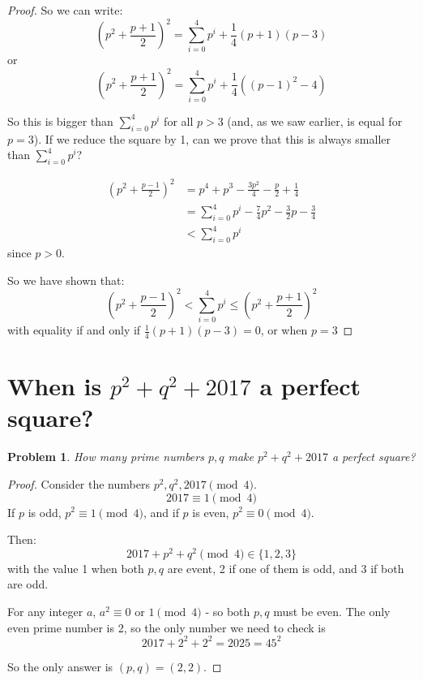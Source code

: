 \documentclass{article}
\newtheorem*{problem}{Problem}
\begin{document}
\begin{proof}
	So we can write:
	\[ (p^2 + \frac{p+1}{2})^2 = \sum_{i=0}^4 p^i + \frac{1}{4}(p+1)(p-3) \]
	or
	\[ (p^2 + \frac{p+1}{2})^2 = \sum_{i=0}^4 p^i + \frac{1}{4}((p-1)^2-4) \]

	So this is bigger than $\sum_{i=0}^4 p^i$ for all $p>3$ (and, as we saw earlier, is
	equal for $p=3$). If we reduce the square by 1, can we prove that this is always
	smaller than $\sum_{i=0}^4 p^i$?

	\begin{align*}
		(p^2 + \frac{p-1}{2})^2 &= p^4 + p^3 - \frac{3p^2}{4} - \frac{p}{2} + \frac{1}{4}\\
		&= \sum_{i=0}^4 p^i -\frac{7}{4}p^2 - \frac{3}{2}p - \frac{3}{4} \\
		&< \sum_{i=0}^4 p^i
	\end{align*}
	since $p>0$.

	So we have shown that:
	\[(p^2 + \frac{p-1}{2})^2 < \sum_{i=0}^4 p^i \leq (p^2 + \frac{p+1}{2})^2 \] 
	with equality if and only if $\frac{1}{4}(p+1)(p-3) = 0$, or when $p=3$

\end{proof}

\section{When is $p^2 + q^2 + 2017$ a perfect square?}

\begin{problem}
        How many prime numbers $p, q$ make $p^2 + q^2 + 2017$ a perfect square?
\end{problem}

\begin{proof}
	Consider the numbers $p^2,q^2,2017 \pmod{4}$.
	\[2017 \equiv 1 \pmod{4} \]
	If $p$ is odd, $p^2 \equiv 1 \pmod{4}$, and if $p$ is even, $p^2 \equiv 0 \pmod{4}$.

	Then: 
	\[ 2017 + p^2 + q^2 \pmod{4} \in \{1,2,3\} \]
	with the value 1 when both $p,q$ are event, 2 if one of them is odd, and 3 if both
	are odd.

	For any integer $a$, $a^2 \equiv 0 \text{ or } 1 \pmod{4}$ - so both $p,q$ must be
	even. The only even prime number is 2, so the only number we need to check is
	\[ 2017 + 2^2 + 2^2 = 2025 = 45^2 \]

	So the only answer is $(p,q) = (2,2)$.
\end{proof}
\end{document}
